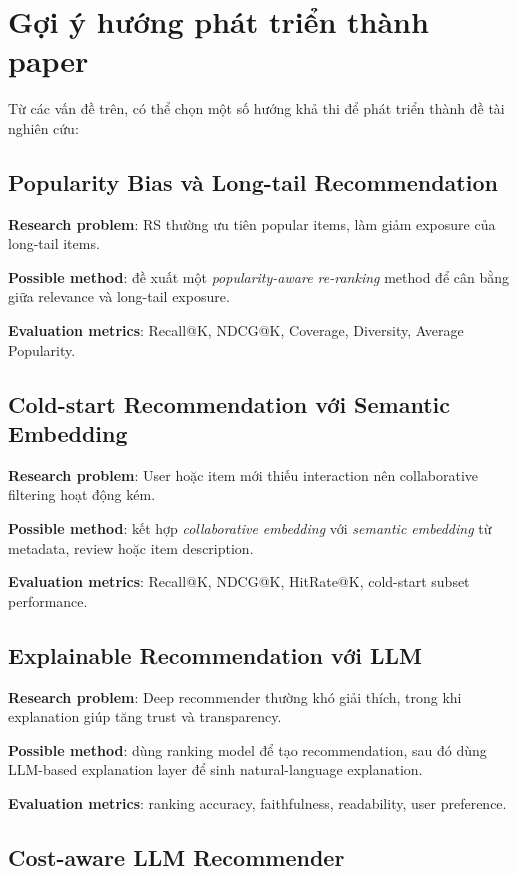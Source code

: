 \documentclass[12pt,a4paper]{article}
\begin{document}
\section{Gợi ý hướng phát triển thành paper}

Từ các vấn đề trên, có thể chọn một số hướng khả thi để phát triển thành đề tài nghiên cứu:

\subsection{Popularity Bias và Long-tail Recommendation}

\textbf{Research problem}: RS thường ưu tiên popular items, làm giảm exposure của long-tail items. 

\textbf{Possible method}: đề xuất một \textit{popularity-aware re-ranking} method để cân bằng giữa relevance và long-tail exposure.

\textbf{Evaluation metrics}: Recall@K, NDCG@K, Coverage, Diversity, Average Popularity.

\subsection{Cold-start Recommendation với Semantic Embedding}

\textbf{Research problem}: User hoặc item mới thiếu interaction nên collaborative filtering hoạt động kém.

\textbf{Possible method}: kết hợp \textit{collaborative embedding} với \textit{semantic embedding} từ metadata, review hoặc item description.

\textbf{Evaluation metrics}: Recall@K, NDCG@K, HitRate@K, cold-start subset performance.

\subsection{Explainable Recommendation với LLM}

\textbf{Research problem}: Deep recommender thường khó giải thích, trong khi explanation giúp tăng trust và transparency.

\textbf{Possible method}: dùng ranking model để tạo recommendation, sau đó dùng LLM-based explanation layer để sinh natural-language explanation.

\textbf{Evaluation metrics}: ranking accuracy, faithfulness, readability, user preference.

\subsection{Cost-aware LLM Recommender}
\end{document}

